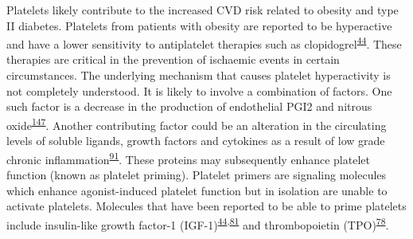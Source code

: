 \documentclass[11pt,twoside]{bristolthesis}
\begin{document}
Platelets likely contribute to the increased CVD risk related to obesity and type II diabetes. Platelets from patients with obesity are reported to be hyperactive and have a lower sensitivity to antiplatelet therapies such as clopidogrel\textsuperscript{\protect\hyperlink{ref-Nardin2015}{44}}. These therapies are critical in the prevention of ischaemic events in certain circumstances. The underlying mechanism that causes platelet hyperactivity is not completely understood. It is likely to involve a combination of factors. One such factor is a decrease in the production of endothelial PGI2 and nitrous oxide\textsuperscript{\protect\hyperlink{ref-BelindeChantemele2012a}{147}}. Another contributing factor could be an alteration in the circulating levels of soluble ligands, growth factors and cytokines as a result of low grade chronic inflammation\textsuperscript{\protect\hyperlink{ref-Esser2014}{91}}. These proteins may subsequently enhance platelet function (known as platelet priming). Platelet primers are signaling molecules which enhance agonist-induced platelet function but in isolation are unable to activate platelets. Molecules that have been reported to be able to prime platelets include insulin-like growth factor-1 (IGF-1)\textsuperscript{\protect\hyperlink{ref-Nardin2015}{44},\protect\hyperlink{ref-Blair2015}{81}} and thrombopoietin (TPO)\textsuperscript{\protect\hyperlink{ref-Maury2010a}{78}}.
\end{document}
